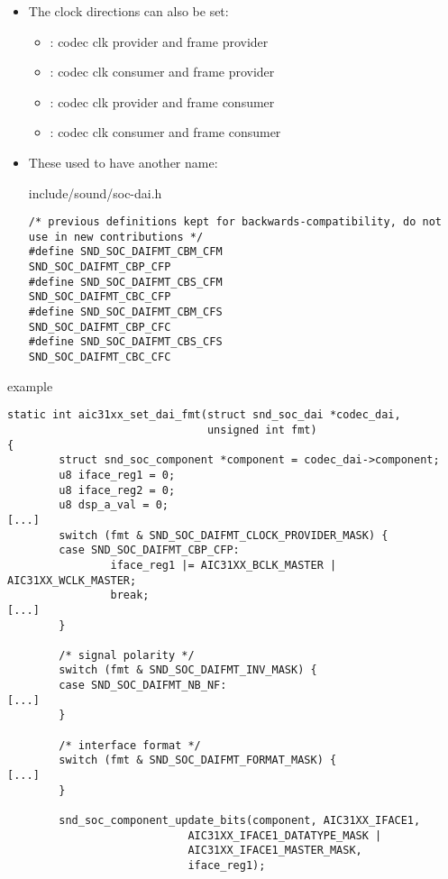 \begin{frame}[fragile]{}
  \begin{itemize}
  \item The clock directions can also be set:
    \begin{itemize}
    \item {}: codec clk provider and frame provider
    \item {}: codec clk consumer and frame provider
    \item {}: codec clk provider and frame consumer
    \item {}: codec clk consumer and frame consumer
    \end{itemize}
  \item These used to have another name:
  \begin{block}{include/sound/soc-dai.h}
    \fontsize{9}{9}\selectfont
    \begin{verbatim}
/* previous definitions kept for backwards-compatibility, do not use in new contributions */
#define SND_SOC_DAIFMT_CBM_CFM                SND_SOC_DAIFMT_CBP_CFP
#define SND_SOC_DAIFMT_CBS_CFM                SND_SOC_DAIFMT_CBC_CFP
#define SND_SOC_DAIFMT_CBM_CFS                SND_SOC_DAIFMT_CBP_CFC
#define SND_SOC_DAIFMT_CBS_CFS                SND_SOC_DAIFMT_CBC_CFC
    \end{verbatim}
  \end{block}
  \end{itemize}
\end{frame}

\begin{frame}[fragile]{ example}
  \begin{block}{}
    \fontsize{7}{7}\selectfont
    \begin{verbatim}
static int aic31xx_set_dai_fmt(struct snd_soc_dai *codec_dai,
                               unsigned int fmt)
{
        struct snd_soc_component *component = codec_dai->component;
        u8 iface_reg1 = 0;
        u8 iface_reg2 = 0;
        u8 dsp_a_val = 0;
[...]
        switch (fmt & SND_SOC_DAIFMT_CLOCK_PROVIDER_MASK) {
        case SND_SOC_DAIFMT_CBP_CFP:
                iface_reg1 |= AIC31XX_BCLK_MASTER | AIC31XX_WCLK_MASTER;
                break;
[...]
        }

        /* signal polarity */
        switch (fmt & SND_SOC_DAIFMT_INV_MASK) {
        case SND_SOC_DAIFMT_NB_NF:
[...]
        }

        /* interface format */
        switch (fmt & SND_SOC_DAIFMT_FORMAT_MASK) {
[...]
        }

        snd_soc_component_update_bits(component, AIC31XX_IFACE1,
                            AIC31XX_IFACE1_DATATYPE_MASK |
                            AIC31XX_IFACE1_MASTER_MASK,
                            iface_reg1);
    \end{verbatim}
  \end{block}
\end{frame}

